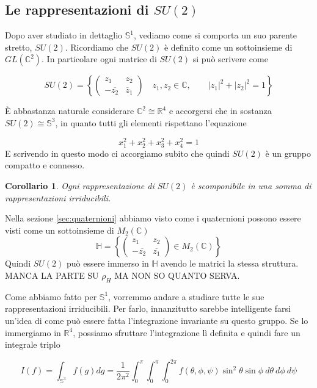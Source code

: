 \documentclass[11pt]{article}
\theoremstyle{plain}
\newtheorem*{cor}{Corollario}
\theoremstyle{definition}
\theoremstyle{remark}
\newcommand{\C}{\mathbb{C}}
\newcommand{\R}{\mathbb{R}}
\newcommand{\HH}{\mathbb{H}}
\newcommand{\dint}{\displaystyle\int}
\begin{document}
\newpage
\subsection{Le rappresentazioni di $SU(2)$}



Dopo aver studiato in dettaglio $\mathbb{S}^1$, vediamo come si comporta un suo parente stretto, $SU(2)$. Ricordiamo che $SU(2)$ è definito come un sottoinsieme di $GL(\C^2)$. In particolare ogni matrice di $SU(2)$ si può scrivere come

 \[ SU(2) = \left\{  \left(\begin{array}{cc} z_1 & z_2 \\ -\overline{z_2} & \overline z_1 \end{array}\right) \quad z_1, z_2 \in \C  , \qquad |z_1|^2 + |z_2|^2 = 1\right\} \]

 È abbastanza naturale considerare $\C^2 \cong \R^4$ e accorgersi che in sostanza $SU(2) \cong \mathbb{S}^3$, in quanto tutti gli elementi rispettano l'equazione

 \[ x_1 ^2 + x_2^2 + x_3^2 + x_4^2 = 1 \]
E scrivendo in questo modo ci accorgiamo subito che quindi $SU(2)$ è un gruppo compatto e connesso.
\begin{cor}
Ogni rappresentazione di $SU(2)$ è scomponibile in una somma di rappresentazioni irriducibili.
\end{cor}
Nella sezione \ref{sec:quaternioni} abbiamo visto come i quaternioni possono essere visti come un sottoinsieme di $M_2(\C)$
\[
\mathbb{H}= \left\{\begin{pmatrix}
 z_1& z_2\\
 -\overline{z_2}& \overline{z_1}
\end{pmatrix}\in M_2(\C) \right\}
\]
Quindi $SU(2)$ può essere immerso in $\HH$ avendo le matrici la stessa struttura.\\
 MANCA LA PARTE SU $\rho_H$ MA NON SO QUANTO SERVA.



Come abbiamo fatto per $\mathbb{S}^1$, vorremmo andare a studiare tutte le sue rappresentazioni irriducibili. Per farlo, innanzitutto sarebbe intelligente farsi un'idea di come può essere fatta l'integrazione invariante su questo gruppo. Se lo immergiamo in $\R^4$, possiamo sfruttare l'integrazione lì definita e quindi fare un integrale triplo

 \[ I(f) = \dint_{\mathbb{S}^3} f(g) dg = \dfrac{1}{2\pi^2} \dint_0^\pi \dint_0^{\pi} \dint_0 ^{2\pi} f(\theta, \phi, \psi) \sin^2\theta\sin\phi \ d\theta \ d\phi \ d\psi\]
\end{document}
